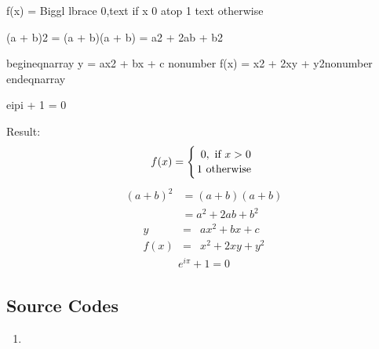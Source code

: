 \documentclass[letterpaper,11pt,english]{sphinxmanual}
\begin{document}
\begin{sphinxVerbatim}[commandchars=\\\{\}]
 

        f(x)
        =
        \PYGZbs{}Biggl \PYGZbs{}lbrace
        \PYGZob{}
        0,\PYGZbs{}text\PYGZob{} if \PYGZcb{}
           \PYGZob{} x \PYGZgt{}0\PYGZcb{}
        \PYGZbs{}atop
        1 \PYGZbs{}text\PYGZob{} otherwise \PYGZcb{}
        \PYGZcb{}

 

   (a + b)\PYGZca{}2  \PYGZam{}=  (a + b)(a + b) \PYGZbs{}\PYGZbs{}
              \PYGZam{}=  a\PYGZca{}2 + 2ab + b\PYGZca{}2

 

   \PYGZbs{}begin\PYGZob{}eqnarray\PYGZcb{}
      y    \PYGZam{} = \PYGZam{} ax\PYGZca{}2 + bx + c \PYGZbs{}nonumber\PYGZbs{}\PYGZbs{}
      f(x) \PYGZam{} = \PYGZam{} x\PYGZca{}2 + 2xy + y\PYGZca{}2\PYGZbs{}nonumber
   \PYGZbs{}end\PYGZob{}eqnarray\PYGZcb{}

  e\PYGZca{}\PYGZob{}i\PYGZbs{}pi\PYGZcb{} + 1 = 0
    
\end{sphinxVerbatim}

Result:
\begin{equation*}
\begin{split}f(x)
=
\Biggl \lbrace
{
0,\text{ if }
   { x >0}
\atop
1 \text{ otherwise }
}\end{split}
\end{equation*}\begin{equation*}
\begin{split}(a + b)^2  &=  (a + b)(a + b) \\
           &=  a^2 + 2ab + b^2\end{split}
\end{equation*}\begin{eqnarray}
   y    & = & ax^2 + bx + c \nonumber\\
   f(x) & = & x^2 + 2xy + y^2\nonumber
\end{eqnarray}\begin{equation}\label{equation:rtxt:euler}
\begin{split}e^{i\pi} + 1 = 0\end{split}
\end{equation}

\subsection{Source Codes}
\label{\detokenize{rtxt:source-codes}}\begin{enumerate}
\def\theenumi{\arabic{enumi}}
\def\labelenumi{\theenumi .}
\makeatletter\def\p@enumii{\p@enumi \theenumi .}\makeatother
\item {} 

\end{enumerate}
\end{document}
